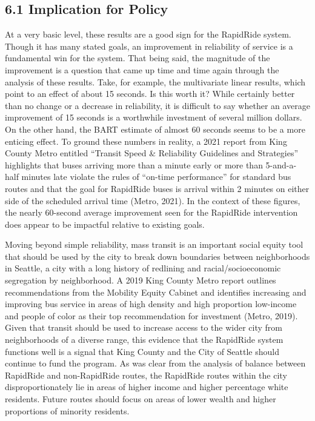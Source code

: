 \documentclass[
  12pt,
]{article}
\begin{document}
\subsection{6.1 Implication for Policy}\label{implication-for-policy}

At a very basic level, these results are a good sign for the RapidRide
system. Though it has many stated goals, an improvement in reliability
of service is a fundamental win for the system. That being said, the
magnitude of the improvement is a question that came up time and time
again through the analysis of these results. Take, for example, the
multivariate linear results, which point to an effect of about 15
seconds. Is this worth it? While certainly better than no change or a
decrease in reliability, it is difficult to say whether an average
improvement of 15 seconds is a worthwhile investment of several million
dollars. On the other hand, the BART estimate of almost 60 seconds seems
to be a more enticing effect. To ground these numbers in reality, a 2021
report from King County Metro entitled ``Transit Speed \& Reliability
Guidelines and Strategies'' highlights that buses arriving more than a
minute early or more than 5-and-a-half minutes late violate the rules of
``on-time performance'' for standard bus routes and that the goal for
RapidRide buses is arrival within 2 minutes on either side of the
scheduled arrival time (Metro, 2021). In the context of these figures,
the nearly 60-second average improvement seen for the RapidRide
intervention does appear to be impactful relative to existing goals.

Moving beyond simple reliability, mass transit is an important social
equity tool that should be used by the city to break down boundaries
between neighborhoods in Seattle, a city with a long history of
redlining and racial/socioeconomic segregation by neighborhood. A 2019
King County Metro report outlines recommendations from the Mobility
Equity Cabinet and identifies increasing and improving bus service in
areas of high density and high proportion low-income and people of color
as their top recommendation for investment (Metro, 2019). Given that
transit should be used to increase access to the wider city from
neighborhoods of a diverse range, this evidence that the RapidRide
system functions well is a signal that King County and the City of
Seattle should continue to fund the program. As was clear from the
analysis of balance between RapidRide and non-RapidRide routes, the
RapidRide routes within the city disproportionately lie in areas of
higher income and higher percentage white residents. Future routes
should focus on areas of lower wealth and higher proportions of minority
residents.
\end{document}
